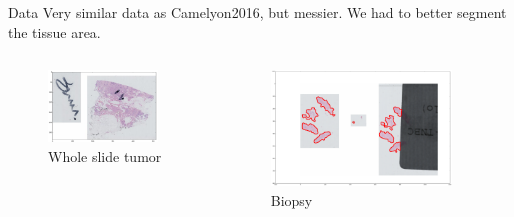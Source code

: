 \documentclass{beamer}
\begin{document}
\begin{frame}{Data}
Very similar data as Camelyon2016, but messier. 
We had to better segment the tissue area.
\begin{columns}[T] %
\begin{column}{.5\textwidth}
\begin{figure}[!ht]
\centering
\includegraphics[width=0.9\textwidth]{slideFabien1.png}\par 
\caption{Whole slide tumor}
\label{fig: fab1}
\end{figure}
\end{column}%
\begin{column}{.5\textwidth}
\begin{figure}[!ht]
\centering
\includegraphics[width=0.9\textwidth]{slideFabien2.png}\par 
\caption{Biopsy}
\label{fig: fab2}
\end{figure}
\end{column}%
\end{columns}


\end{frame}
\end{document}

